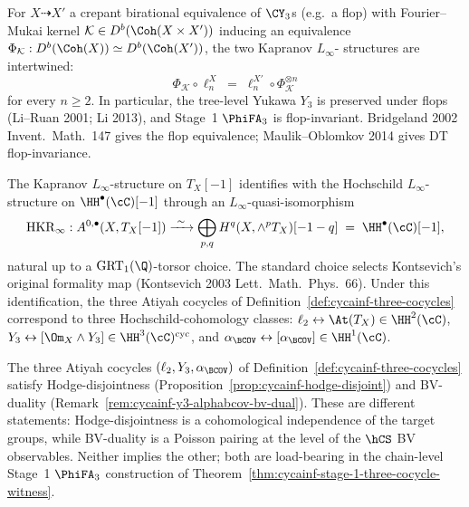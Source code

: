 \begin{remark}
\label{rem:cycainf-fm-naturality}
For $X \dashrightarrow X'$ a crepant birational equivalence of
$\CY_3$s (e.g.\ a flop) with Fourier--Mukai kernel $\mathcal K \in
D^b(\Coh(X \times X'))$ inducing an equivalence $\Phi_{\mathcal K}:
D^b(\Coh(X)) \simeq D^b(\Coh(X'))$, the two Kapranov $L_\infty$-
structures are intertwined:
\[
 \Phi_{\mathcal K} \circ \ell_n^{X} \;=\; \ell_n^{X'} \circ
 \Phi_{\mathcal K}^{\otimes n}
\]
for every $n \geq 2$. In particular, the tree-level Yukawa $Y_3$ is
preserved under flops (Li--Ruan 2001; Li 2013), and Stage~1
$\PhiFA_3$ is flop-invariant. Bridgeland 2002 Invent.\ Math.\ 147 gives
the flop equivalence; Maulik--Oblomkov 2014 gives DT flop-invariance.
\end{remark}

\begin{remark}
\label{rem:cycainf-kapranov-hkr}
The Kapranov $L_\infty$-structure on $T_X[-1]$ identifies with the
Hochschild $L_\infty$-structure on $\HH^\bullet(\cC)[-1]$ through an
$L_\infty$-quasi-isomorphism
\[
 \mathrm{HKR}_\infty : A^{0, \bullet}(X, T_X[-1]) \xrightarrow{\ \sim\ }
 \bigoplus_{p,q} H^q(X, \wedge^p T_X)[-1-q] \;=\;
 \HH^\bullet(\cC)[-1],
\]
natural up to a $\mathrm{GRT}_1(\Q)$-torsor choice. The standard choice
selects Kontsevich's original formality map (Kontsevich 2003 Lett.\
Math.\ Phys.\ 66). Under this identification, the three Atiyah
cocycles of Definition~\ref{def:cycainf-three-cocycles} correspond to
three Hochschild-cohomology classes:
$\ell_2 \leftrightarrow \At(T_X) \in \HH^2(\cC)$, $Y_3 \leftrightarrow
[\Om_X \wedge Y_3] \in \HH^3(\cC)^{\mathrm{cyc}}$, and $\alpha_{\BCOV}
\leftrightarrow [\alpha_{\BCOV}] \in \HH^1(\cC)$.
\end{remark}

\begin{remark}
\label{rem:cycainf-hodge-vs-bv}
The three Atiyah cocycles $(\ell_2, Y_3, \alpha_{\BCOV})$ of
Definition~\ref{def:cycainf-three-cocycles} satisfy Hodge-disjointness
(Proposition~\ref{prop:cycainf-hodge-disjoint}) and BV-duality
(Remark~\ref{rem:cycainf-y3-alphabcov-bv-dual}). These are different
statements: Hodge-disjointness is a cohomological independence of the
target groups, while BV-duality is a Poisson pairing at the level of
the $\hCS$ BV observables. Neither implies the other; both are
load-bearing in the chain-level Stage~1 $\PhiFA_3$ construction of
Theorem~\ref{thm:cycainf-stage-1-three-cocycle-witness}.
\end{remark}
